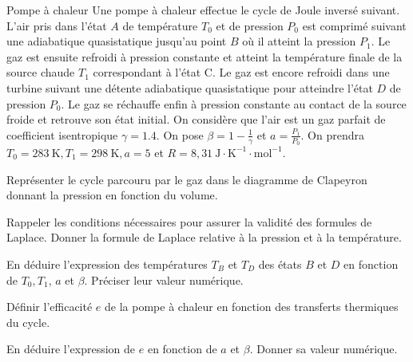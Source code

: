 \begin{exo}[PC][1][colle]{Pompe à chaleur}
Une pompe à chaleur effectue le cycle de Joule inversé suivant. L'air pris dans l'état $A$ de température $T_0$ et de pression $P_0$ est comprimé suivant une adiabatique quasistatique jusqu'au point $B$ où il atteint la pression $P_1$. Le gaz est ensuite refroidi à pression constante et atteint la température finale de la source chaude $T_1$ correspondant à l'état C. Le gaz est encore refroidi dans une turbine suivant une détente adiabatique quasistatique pour atteindre l'état $D$ de pression $P_0$. Le gaz se réchauffe enfin à pression constante au contact de la source froide et retrouve son état initial.
On considère que l'air est un gaz parfait de coefficient isentropique $\gamma=\num{1.4}$. On pose $\beta=1-\frac{1}{\gamma}$ et $a=\frac{P_1}{P_0}$. On prendra $T_0=283 \mathrm{~K}, T_1=298 \mathrm{~K}, a=5$ et $R=8,31 \mathrm{~J} \cdot \mathrm{K}^{-1} \cdot \mathrm{mol}^{-1}$.
\begin{quest}
	\item Représenter le cycle parcouru par le gaz dans le diagramme de Clapeyron donnant la pression en fonction du volume.
	\item Rappeler les conditions nécessaires pour assurer la validité des formules de Laplace. Donner la formule de Laplace relative à la pression et à la température.
	\item En déduire l'expression des températures $T_B$ et $T_D$ des états $B$ et $D$ en fonction de $T_0, T_1$, $a$ et $\beta$. Préciser leur valeur numérique.
	\item Définir l'efficacité $e$ de la pompe à chaleur en fonction des transferts thermiques du cycle.
	\item En déduire l'expression de $e$ en fonction de $a$ et $\beta$. Donner sa valeur numérique.
\end{quest}
\end{exo}

